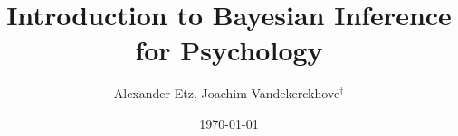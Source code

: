\documentclass[doc]{apa6}
\title{Introduction to Bayesian Inference for Psychology}
\author{Alexander Etz, Joachim Vandekerckhove$^\dagger$}%
\affiliation{University of California, Irvine}%
\date{\today}
\renewcommand{\|}{\,|\,}
\begin{document}
\begin{figure}[th]
\begin{center}

\end{center}
\end{figure}
\end{document}
